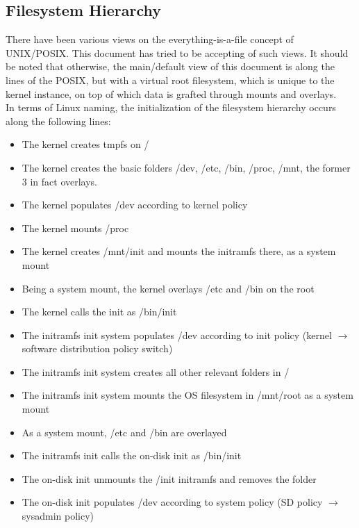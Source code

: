 \documentclass[a4paper,utf8,11pt]{article}
\begin{document}
	\subsection{Filesystem Hierarchy}
	There have been various views on the everything-is-a-file concept of UNIX/POSIX. This document has tried to be accepting of such views. It should be noted that otherwise, the main/default view of this document is along the lines of the POSIX, but with a virtual root filesystem, which is unique to the kernel instance, on top of which data is grafted through mounts and overlays.\\
	In terms of Linux naming, the initialization of the filesystem hierarchy occurs along the following lines:
	\begin{itemize}
		\item The kernel creates tmpfs on /
		\item The kernel creates the basic folders /dev, /etc, /bin, /proc, /mnt, the former 3 in fact overlays.
		\item The kernel populates /dev according to kernel policy
		\item The kernel mounts /proc
		\item The kernel creates /mnt/init and mounts the initramfs there, as a system mount
		\item Being a system mount, the kernel overlays /etc and /bin on the root
		\item The kernel calls the init as /bin/init
		\item The initramfs init system populates /dev according to init policy (kernel $\rightarrow$ software distribution policy switch)
		\item The initramfs init system creates all other relevant folders in /
		\item The initramfs init system mounts the OS filesystem in /mnt/root as a system mount
		\item As a system mount, /etc and /bin are overlayed
		\item The initramfs init calls the on-disk init as /bin/init
		\item The on-disk init unmounts the /init initramfs and removes the folder
		\item The on-disk init populates /dev according to system policy (SD policy $\rightarrow$ sysadmin policy)
	\end{itemize}
\end{document}
